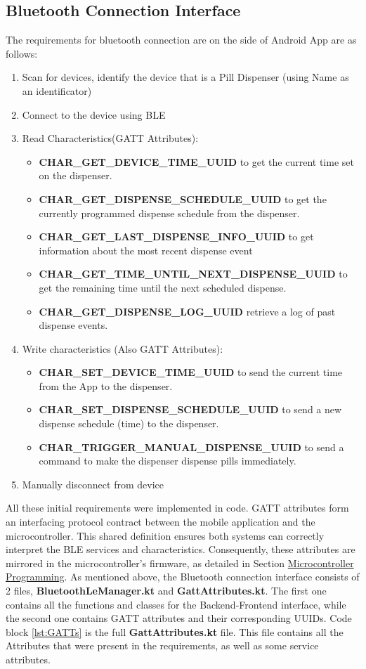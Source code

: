 \subsection{Bluetooth Connection Interface}
The requirements for bluetooth connection are on the side of Android App are as follows:
\begin{enumerate}
	\item Scan for devices, identify the device that is a Pill Dispenser (using Name as an identificator)
	\item Connect to the device using \ac{BLE}
	\item Read Characteristics(\ac{GATT} Attributes): 
	\begin{itemize}
		\item \textbf{CHAR\_GET\_DEVICE\_TIME\_UUID} to get the current time set on the dispenser.
		\item \textbf{CHAR\_GET\_DISPENSE\_SCHEDULE\_UUID} to get the currently programmed dispense schedule from the dispenser.
		\item \textbf{CHAR\_GET\_LAST\_DISPENSE\_INFO\_UUID} to get information about the most recent dispense event
		\item \textbf{CHAR\_GET\_TIME\_UNTIL\_NEXT\_DISPENSE\_UUID} to get the remaining time until the next scheduled dispense.
		\item \textbf{CHAR\_GET\_DISPENSE\_LOG\_UUID} retrieve a log of past dispense events.
	\end{itemize}
	\item Write characteristics (Also \ac{GATT} Attributes):
	\begin{itemize}
		\item \textbf{CHAR\_SET\_DEVICE\_TIME\_UUID} to send the current time from the App to the dispenser.
		\item \textbf{CHAR\_SET\_DISPENSE\_SCHEDULE\_UUID} to send a new dispense schedule (time) to the dispenser.
		\item \textbf{CHAR\_TRIGGER\_MANUAL\_DISPENSE\_UUID} to send a command to make the dispenser dispense pills immediately.
	\end{itemize}
	\item Manually disconnect from device
\end{enumerate}
All these initial requirements were implemented in code. \ac{GATT} attributes form an interfacing protocol contract between the mobile application and the microcontroller. This shared definition ensures both systems can correctly interpret the \ac{BLE} services and characteristics. Consequently, these attributes are mirrored in the microcontroller's firmware, as detailed in Section  \hyperref[sec:Backenddev]{Microcontroller Programming}. As mentioned above, the Bluetooth connection interface consists of 2 files, \textbf{BluetoothLeManager.kt} and \textbf{GattAttributes.kt}. The first one contains all the functions and classes for the Backend-Frontend interface, while the second one contains \ac{GATT} attributes and their corresponding \ac{UUID}s. Code block \ref{lst:GATTs} is the full \textbf{GattAttributes.kt} file. This file contains all the Attributes that were present in the requirements, as well as some service attributes.
